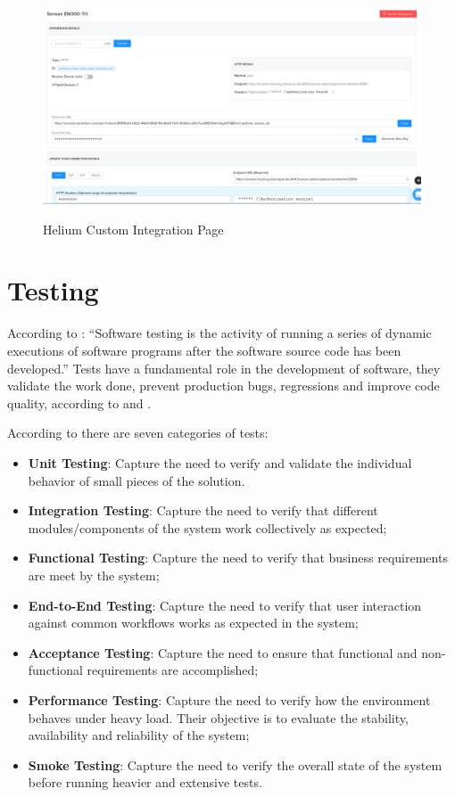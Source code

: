 \begin{figure}
    \centering
    \resizebox{\columnwidth}{!}
    {
       \includegraphics{assets/figures/sensor/integration.png}
    }
    \caption[Helium Custom Integration Page]{Helium Custom Integration Page}
    \label{fig:implementation:description:sensor:integration}
\end{figure}

\section{Testing}
\label{sec:implementation:testing}

According to \cite{booktest}: ``Software testing is the activity of running a series of dynamic executions of software programs after the software source code has been developed.''
Tests have a fundamental role in the development of software, they validate the work done, prevent production bugs, regressions and improve code quality, according to \cite{linuxtest} and \cite{imbtest}.

According to \cite{typetest} there are seven categories of tests:

\begin{itemize}
    \item \textbf{Unit Testing}: Capture the need to verify and validate the individual behavior of small pieces of the solution.
    \item \textbf{Integration Testing}: Capture the need to verify that different modules/components of the system work collectively as expected;
    \item \textbf{Functional Testing}: Capture the need to verify that business requirements are meet by the system;
    \item \textbf{End-to-End Testing}: Capture the need to verify that user interaction against common workflows works as expected in the system;
    \item \textbf{Acceptance Testing}: Capture the need to ensure that functional and non-functional requirements are accomplished;
    \item \textbf{Performance Testing}: Capture the need to verify how the environment behaves under heavy load. Their objective is to evaluate the stability, availability and reliability of the system;
    \item \textbf{Smoke Testing}: Capture the need to verify the overall state of the system before running heavier and extensive tests.
\end{itemize}

